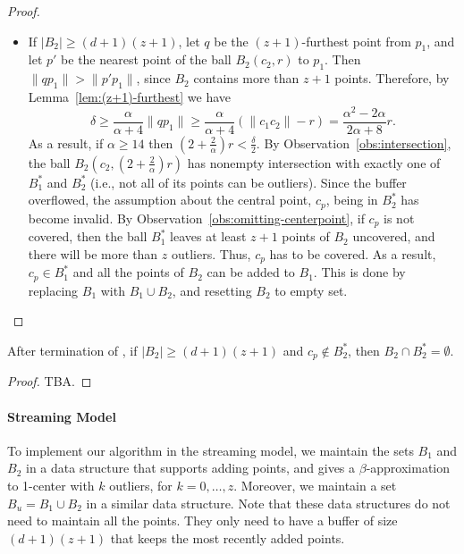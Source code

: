 \documentclass[envcountsame]{cls/cccg15}
\newcommand{\rc}{r}
\newcommand{\cp}{c_p}
\newcommand{\dz}{(d + 1)(z + 1)}
\newcommand{\card}[1]{\left|{#1}\right|}
\newcommand{\len}[1]{\|{#1}\|}
\newcommand{\gee}{\geqslant}
\renewcommand{\geq}{\gee}
\renewcommand{\ge}{\gee}
\begin{document}
\begin{proof}
\begin{itemize}
\item 
If $\card{B_2} \ge \dz$, let $q$ be the $(z+1)$-furthest point from $p_1$,
and let $p'$ be the nearest point of the ball $B_2(c_2, \rc )$ to $p_1$. 
Then $\len{qp_1} > \len{p'p_1}$, since $B_2$ contains more than $z+1$ points. 
Therefore, by Lemma~\ref{lem:(z+1)-furthest} we have
\[
\delta \ge \frac{\alpha }{\alpha+4}\len{qp_1} \ge \frac{\alpha}{\alpha+4} (\len{c_1c_2} - \rc ) = \frac{\alpha^2 - 2\alpha}{2\alpha + 8} \rc.
\]
As a result, if $\alpha \geq 14$ then $(2 + \frac{2}{\alpha}) \rc  < \frac{\delta}{2}$. 
By Observation~\ref{obs:intersection}, the ball $B_2(c_2, (2 + \frac{2}{\alpha}) \rc )$ 
has nonempty intersection with exactly one of $B_1^*$ and $B_2^*$ 
(i.e., not all of its points can be outliers). 
Since the buffer overflowed, the assumption about the central point, 
$\cp$, being in $B_2^*$ has become invalid. 
By Observation~\ref{obs:omitting-centerpoint}, if $\cp$ is not covered, 
then the ball $B_1^*$ leaves at least $z+1$ points of $B_2$ uncovered, 
and there will be more than $z$ outliers. 
Thus, $\cp$ has to be covered. 
As a result, $\cp \in B_1^*$ and all the points of $B_2$ can be added to $B_1$. 
This is done by replacing $B_1$ with $B_1 \cup B_2$, and resetting $B_2$ to empty set.
\end{itemize}
\end{proof}


\begin{lemma}
\label{lem:}
	After termination of , 
	if $|B_2| \ge \dz$ and $\cp \not\in B_2^*$,
	then $B_2 \cap B_2^* = \emptyset$.
\end{lemma}

\begin{proof}
	TBA.
\end{proof}


\paragraph{Streaming Model}
To implement our algorithm in the streaming model,
we maintain the sets $B_1$ and $B_2$ 
in a data structure that supports adding points,
and gives a $\beta$-approximation to 1-center with $k$ outliers, for $k=0,\dots,z$.
Moreover, we maintain a set $B_u = B_1 \cup B_2$ in a similar data structure.
Note that these data structures do not need to maintain all the points. 
They only need to have a buffer of size $\dz$ that keeps the most recently added points.
\end{document}
